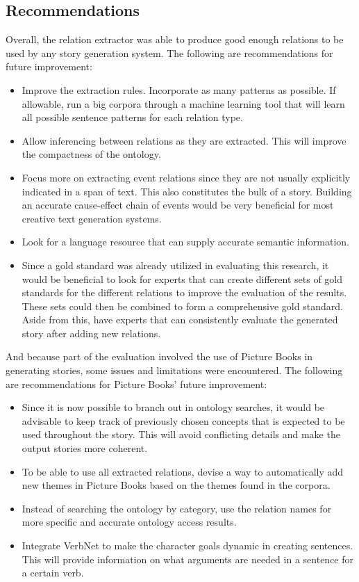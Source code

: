 \subsection{Recommendations}
\label{sec:reco}

Overall, the relation extractor was able to produce good enough relations to be used by any story generation system. The following are recommendations for future improvement:

\begin{itemize}
\item Improve the extraction rules. Incorporate as many patterns as possible. If allowable, run a big corpora through a machine learning tool that will learn all possible sentence patterns for each relation type.
\item Allow inferencing between relations as they are extracted. This will improve the compactness of the ontology.
\item Focus more on extracting event relations since they are not usually explicitly indicated in a span of text. This also constitutes the bulk of a story. Building an accurate cause-effect chain of events would be very beneficial for most creative text generation systems.
\item Look for a language resource that can supply accurate semantic information.
\item Since a gold standard was already utilized in evaluating this research, it would be beneficial to look for experts that can create different sets of gold standards for the different relations to improve the evaluation of the results. These sets could then be combined to form a comprehensive gold standard. Aside from this, have experts that can consistently evaluate the generated story after adding new relations. 
\end{itemize}

And because part of the evaluation involved the use of Picture Books in generating stories, some issues and limitations were encountered. The following are recommendations for Picture Books' future improvement:

\begin{itemize}
\item Since it is now possible to branch out in ontology searches, it would be advisable to keep track of previously chosen concepts that is expected to be used throughout the story. This will avoid conflicting details and make the output stories more coherent.
\item To be able to use all extracted relations, devise a way to automatically add new themes in Picture Books based on the themes found in the corpora. 
\item Instead of searching the ontology by category, use the relation names for more specific and accurate ontology access results.
\item Integrate VerbNet to make the character goals dynamic in creating sentences. This will provide information on what arguments are needed in a sentence for a certain verb.
\end{itemize}









